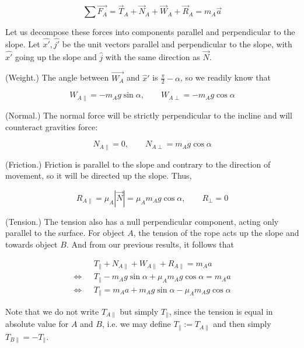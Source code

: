 \documentclass[12pt]{article}
\theoremstyle{definition}
\begin{document}
\begin{equation*}
    \sum \vec{F_A} = \vec{T}_A + \vec{N}_A + \vec{W}_A + \vec{R}_A = m_A \vec{a}
\end{equation*}

Let us decompose these forces into components parallel and perpendicular to the
slope. Let $\hat{x'}, \hat{j'}$ be the unit vectors parallel and perpendicular
to the slope, with $\hat{x'}$ going up the slope and $\hat{j}$ with the same
direction as $\vec{N}$.

(Weight.) The angle between $\vec{W_A}$ and $\hat{x}'$ is $\frac{\pi}{2} -
\alpha$, so we readily know that 

\begin{equation}
    W_{A \parallel } = -m_A g \sin \alpha, \qquad W_{A \perp} = -m_A g \cos \alpha
\end{equation}

(Normal.) The normal force will be strictly perpendicular to the incline and
will counteract gravities force:

\begin{equation}
    N_{A \parallel } = 0, \qquad N_{A \perp} = m_A g \cos \alpha
\end{equation}

(Friction.) Friction is parallel to the slope and contrary to the direction of
movement, so it will be directed up the slope. Thus, 

\begin{equation}
    R_{A \parallel} = \mu_A \left| \vec{N} \right| = \mu_A m_A g \cos \alpha,
    \qquad R_\perp = 0
\end{equation}

(Tension.) The tension also has a null perpendicular component, acting only
parallel to the surface. For object $A$, the tension of the rope acts up the
slope and towards object $B$. And from our previous results, it follows  that 

\begin{align}
    &T_{\parallel } + N_{A \parallel } + W_{A \parallel } + R_{A \parallel } = m_A a\\ 
    \iff ~ ~ ~ 
    &T_{\parallel} - m_A g \sin \alpha + \mu_A m_A g \cos \alpha = m_A
    a\nonumber\\
    \iff ~ ~ ~& T_{\parallel } = m_A a + m_A g \sin \alpha - \mu_A m_A g \cos
    \alpha\nonumber
\end{align}

Note that we do not write $T_{A \parallel}$ but simply $T_\parallel$, since the
tension is equal in absolute value for $A$ and $B$, i.e. we may define
$T_\parallel := T_{A \parallel}$ and then simply $T_{B \parallel} =
-T_\parallel$.
\end{document}
